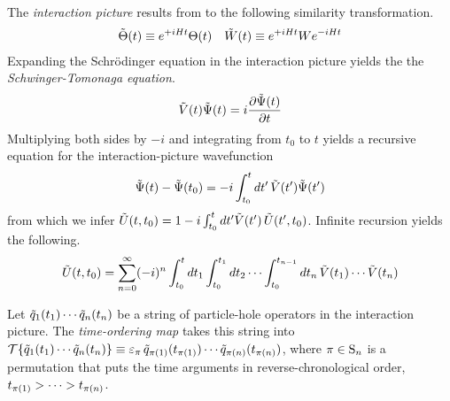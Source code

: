 \documentclass[11pt]{article}
\numberwithin{equation}{section}
\begin{document}
\begin{dfn}
The \textit{interaction picture} results from to the following similarity transformation.
\begin{align}
  \tilde{\Theta }(t)
\equiv
  e^{+iHt}
  \Theta (t)
&&
  \tilde{W}(t)
\equiv
  e^{+iHt}
  W
  e^{-iHt}
\end{align}
Expanding the Schr\"odinger equation in the interaction picture yields the the \textit{Schwinger-Tomonaga equation}.
\begin{align}
\label{eq:schwinger-tomonaga}
  \tilde{V}(t)
  \tilde{\Psi }(t)
=
  i
  \frac {\partial\tilde{\Psi }(t)}{\partial t}
\end{align}
Multiplying both sides by $-i$ and integrating from $t_0$ to $t$ yields a recursive equation for the interaction-picture wavefunction
\begin{align}
\label{eq:integrated-schwinger-tomonaga-equation}
  \tilde{\Psi }(t)
-
  \tilde{\Psi }(t_0)
=
-
  i
  \int_{t_0}^t
  dt'\,
  \tilde{V}(t')
  \tilde{\Psi }(t')
\end{align}
from which we infer
$
  \tilde{U}(t,t_0)
=
  1
-
  i
  \int_{t_0}^t
  dt'
  \tilde{V}(t')\,
  \tilde{U}(t',t_0)
$.
Infinite recursion yields the following.
\begin{align}
\label{eq:time-evolution-infinite-recursion}
  \tilde{U}(t,t_0)
=
  \sum_{n=0}^\infty
  (-i)^n
  \int_{t_0}^t
  dt_1
  \int_{t_0}^{t_1}
  dt_2
  \cdots
  \int_{t_0}^{t_{n-1}}
  dt_n
  \,
  \tilde{V}(t_1)
  \cdots
  \tilde{V}(t_n)
\end{align}
\end{dfn}

\begin{dfn}
\label{dfn:time-ordering}
Let 
$
  \tilde{q}_1(t_1)\cdots \tilde{q}_n(t_n)
$
be a string of particle-hole operators in the interaction picture.\footnotemark
{}
The \textit{time-ordering map} takes this string into
$
  \mc{T}\{
  \tl{q}_1(t_1)\cd \tl{q}_n(t_n)
  \}
\equiv
  \e_\pi \,\tl{q}_{\pi(1)}(t_{\pi(1)})\cd \tl{q}_{\pi(n)}(t_{\pi(n)})
$,
where $\pi\in\mr{S}_n$ is a permutation that puts the time arguments in reverse-chronological order, $t_{\pi(1)}>\cd>t_{\pi(n)}$.
\end{dfn}
\end{document}
